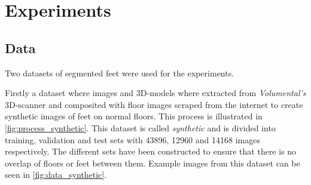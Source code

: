 \documentclass{kththesis}
\begin{document}
\chapter{Experiments}
\section{Data}
Two datasets of segmented feet were used for the experiments.

Firstly a dataset where images and 3D-models where extracted from
\textit{Volumental's}
3D-scanner and composited with floor images scraped from the internet to create
synthetic images of feet on normal floors. This process is illustrated in \cref{fig:process_synthetic}.
This dataset is called
\textit{synthetic} and is divided into training, validation and test sets with
43896, 12960 and 14168 images respectively. The different sets have been
constructed to ensure that there is no overlap of floors or feet between them.
Example images from this dataset can be seen in \cref{fig:data_synthetic}.
\end{document}
